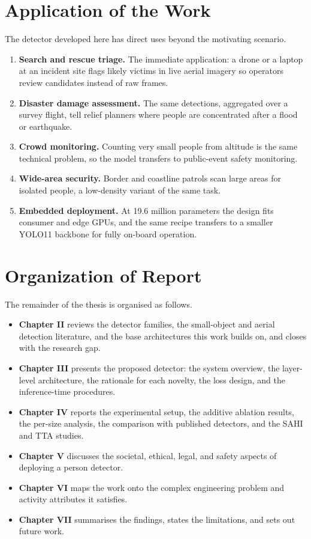 \section{Application of the Work}
The detector developed here has direct uses beyond the motivating scenario.
\begin{enumerate}
  \item \textbf{Search and rescue triage.} The immediate application: a
        drone or a laptop at an incident site flags likely victims in live
        aerial imagery so operators review candidates instead of raw frames.
  \item \textbf{Disaster damage assessment.} The same detections, aggregated
        over a survey flight, tell relief planners where people are
        concentrated after a flood or earthquake.
  \item \textbf{Crowd monitoring.} Counting very small people from altitude
        is the same technical problem, so the model transfers to public-event
        safety monitoring.
  \item \textbf{Wide-area security.} Border and coastline patrols scan large
        areas for isolated people, a low-density variant of the same task.
  \item \textbf{Embedded deployment.} At 19.6 million parameters the design
        fits consumer and edge GPUs, and the same recipe transfers to a
        smaller YOLO11 backbone for fully on-board operation.
\end{enumerate}

\section{Organization of Report}
The remainder of the thesis is organised as follows.
\begin{itemize}
  \item \textbf{Chapter II} reviews the detector families, the small-object
        and aerial detection literature, and the base architectures this work
        builds on, and closes with the research gap.
  \item \textbf{Chapter III} presents the proposed detector: the system
        overview, the layer-level architecture, the rationale for each
        novelty, the loss design, and the inference-time procedures.
  \item \textbf{Chapter IV} reports the experimental setup, the additive
        ablation results, the per-size analysis, the comparison with
        published detectors, and the SAHI and TTA studies.
  \item \textbf{Chapter V} discusses the societal, ethical, legal, and safety
        aspects of deploying a person detector.
  \item \textbf{Chapter VI} maps the work onto the complex engineering
        problem and activity attributes it satisfies.
  \item \textbf{Chapter VII} summarises the findings, states the limitations,
        and sets out future work.
\end{itemize}
